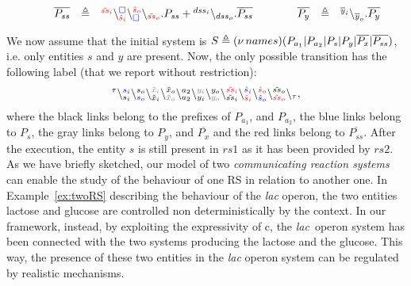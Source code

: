 \begin{example}
\[\begin{array}{lclcl@{\qquad} lclcl}
&&\overline{P_{ss}}&\defeq &\startchain{{\color{red}\tilde{ss}_i}}\chainedlink{{\color{red}\hat{s}_i}}{{\color{blue}\noact}}\chainedlink{{\color{blue}\noact}}{{\color{red}\hat{s}_o}}\chainend{{\color{red}\tilde{ss}_o}}.P_{ss}
+
\startchain{dss_i}\chainend{dss_o}.\overline{P_{ss}}
&
&&\overline{P_{y}}&\defeq &
\startchain{\overline{y}_i}\chainend{\overline{y}_o}.\overline{P_{y}}
\end{array}
\]

\end{example}

\noindent
We now assume that the initial system is $S \triangleq (\nu\, names)(P_{a_1}|P_{a_2}|P_s|P_y|\overline{P_x}|\overline{P_{ss}})$, i.e.
only entities $s$ and $y$ are present. Now, the only possible transition has  the following label (that we report without restriction):
\[
\startchain{\silent}\chainedlink{s_i}{{\color{blue}s_i}}\chainedlink{{\color{blue}s_o}}{s_o}\chainedlink{\tilde{x}_i}{{\color{gray}\tilde{x}_i}}\chainedlink{{\color{gray}\tilde{x}_o}}{\tilde{x}_o} \chainedlink{a_2}{a_2}\chainedlink{y_i}{ {\color{gray}y_i}}\chainedlink{{\color{gray}y_o}}{y_o}\chainedlink{\tilde{ss}_i}{{\color{red}\tilde{ss}_i}}
\chainedlink{{\color{red}\hat{s}_i}}{{\color{blue}\hat{s}_i}}
\chainedlink{{\color{blue}\hat{s}_o}}{{\color{red}\hat{s}_o}}
\chainedlink{{\color{red}\tilde{ss}_o}}{\tilde{ss}_o}\chainend{\silent},
\]
where the black links belong to the prefixes of $P_{a_1}$, and $P_{a_2}$, the blue links belong to $P_s$, the gray links belong to $P_y$, and $\overline{P_x}$ and the red links belong to $\overline{P_{ss}}$.
After the execution, the entity $s$ is still present in $rs1$ as it has been provided by $rs2$.\\

As we have briefly sketched, our model of two \emph{communicating reaction systems} 
can enable the study of the behaviour of one RS
in relation to another one.
In Example~\ref{ex:twoRS} describing  the behaviour of the \emph{lac} operon,
the two entities lactose and glucose are controlled 
non deterministically by the context.
In our framework,
instead, by exploiting the expressivity of c\CNA, 
the \emph{lac} operon system has been connected with the two systems 
producing the lactose and the glucose.
This way, the presence of these two entities in the \emph{lac} operon system 
can be regulated by realistic mechanisms.



